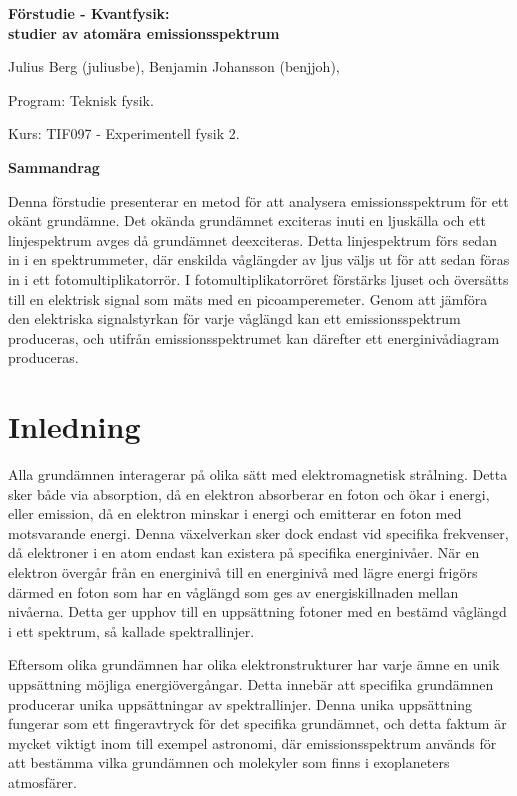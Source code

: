 \documentclass[10pt, a4paper]{article}
\begin{document}
\thispagestyle{empty}
\begin{center}
{\huge\bf Förstudie - Kvantfysik:\\}
{\Large\bf studier av atomära emissionsspektrum
}
\end{center}
\vspace{1.0cm}
\begin{center}
Julius Berg (juliusbe), Benjamin Johansson (benjjoh), \par
Program: Teknisk fysik. \par
Kurs: TIF097 - Experimentell fysik 2.
\end{center}
\vspace{1.0cm}
\centerline{\bf Sammandrag}
 
Denna förstudie presenterar en metod för att analysera emissionsspektrum för ett okänt grundämne.
Det okända grundämnet exciteras inuti en ljuskälla och ett linjespektrum avges då grundämnet deexciteras.
Detta linjespektrum förs sedan in i en spektrummeter, där enskilda våglängder av ljus väljs ut för att sedan föras in i ett fotomultiplikatorrör.
I fotomultiplikatorröret förstärks ljuset och översätts till en elektrisk signal som mäts med en picoamperemeter.
Genom att jämföra den elektriska signalstyrkan för varje våglängd kan ett emissionsspektrum produceras, 
och utifrån emissionsspektrumet kan därefter ett energinivådiagram produceras.
 
\newpage
\tableofcontents
\newpage

\section{Inledning}

Alla grundämnen interagerar på olika sätt med elektromagnetisk strålning.
Detta sker både via absorption, då en elektron absorberar en foton och ökar i energi, eller emission, 
då en elektron minskar i energi och emitterar en foton med motsvarande energi\cite{rana_quantum_electronics}.
Denna växelverkan sker dock endast vid specifika frekvenser, då elektroner i en atom endast kan existera
på specifika energinivåer.
När en elektron övergår från en energinivå till en energinivå med lägre energi frigörs därmed en foton som har en våglängd som ges av energiskillnaden mellan nivåerna.
Detta ger upphov till en uppsättning fotoner med en bestämd våglängd i ett spektrum, så kallade spektrallinjer\cite{TKACHENKO2006107}.

Eftersom olika grundämnen har olika elektronstrukturer har varje ämne en unik uppsättning möjliga energiövergångar.
Detta innebär att specifika grundämnen producerar unika uppsättningar av spektrallinjer.
Denna unika uppsättning fungerar som ett fingeravtryck för det specifika grundämnet, och detta faktum är mycket viktigt inom till exempel astronomi, 
där emissionsspektrum används för att bestämma vilka grundämnen och molekyler som finns i exoplaneters atmosfärer\cite{tessenyi_molecular_detectability}.
\end{document}
